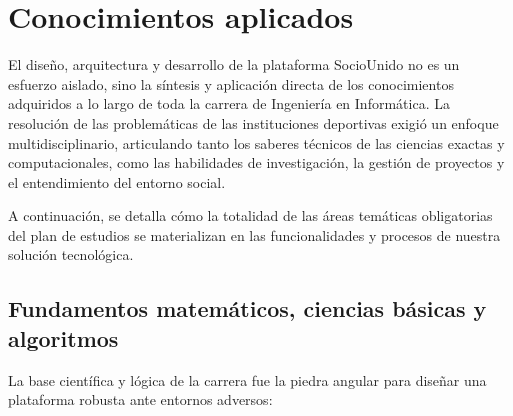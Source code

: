 \section{Conocimientos aplicados}

El diseño, arquitectura y desarrollo de la plataforma SocioUnido no es un esfuerzo aislado, sino la síntesis y aplicación directa de los conocimientos adquiridos a lo largo de toda la carrera de Ingeniería en Informática. La resolución de las problemáticas de las instituciones deportivas exigió un enfoque multidisciplinario, articulando tanto los saberes técnicos de las ciencias exactas y computacionales, como las habilidades de investigación, la gestión de proyectos y el entendimiento del entorno social.

A continuación, se detalla cómo la totalidad de las áreas temáticas obligatorias del plan de estudios se materializan en las funcionalidades y procesos de nuestra solución tecnológica.

\subsection{Fundamentos matemáticos, ciencias básicas y algoritmos}

La base científica y lógica de la carrera fue la piedra angular para diseñar una plataforma robusta ante entornos adversos:

